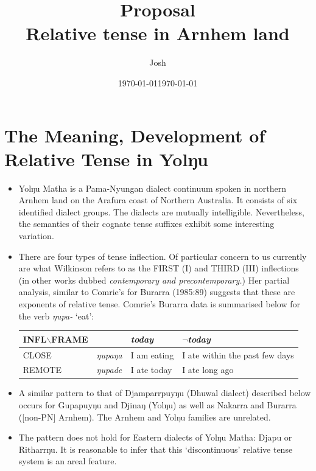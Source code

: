 \documentclass[11pt]{article}
\title{\large Proposal\\\Large \textbf{Relative tense in Arnhem land}}
\date{\today}
\author{Josh}
\date{\today}
\begin{document}
\thispagestyle{empty}
\part*{The Meaning, Development of Relative Tense in Yolŋu}
\begin{itemize}
\item 

Yolŋu Matha is a Pama-Nyungan dialect continuum spoken in northern Arnhem land on the Arafura coast of Northern Australia. It consists of six identified dialect groups. The dialects are mutually intelligible. Nevertheless, the semantics of their cognate tense suffixes exhibit some interesting variation.

\item There are four types of tense inflection. Of particular concern to us currently are what Wilkinson refers to as the FIRST (I) and THIRD (III) inflections (in other works dubbed \textit{contemporary and precontemporary.}) Her partial analysis, similar to Comrie's for Burarra (1985:89) suggests that these are exponents of relative tense. Comrie's Burarra data is summarised below for the verb \textit{ŋupa-} `eat':


\begin{tabular}{llll}
INFL$\backslash$FRAME && \textit{today} & $\neg$\textit{today}\\\midrule
CLOSE&\textit{ŋupaŋa}& I am eating & I ate within the past few days\\
REMOTE&\textit{ŋupade} & I ate today & I ate long ago
\end{tabular}


\item A similar pattern to that of Djamparrpuyŋu (Dhuwal dialect) described below occurs for Gupapuyŋu and Djinaŋ (Yolŋu) as well as Nakarra and Burarra ([non-PN] Arnhem). The Arnhem and Yolŋu families are unrelated.

\item The pattern does not hold for Eastern dialects of Yolŋu Matha: Djapu or Ritharrŋu. It is reasonable to infer that this `discontinuous' relative tense system is an areal feature.
\end{itemize}
\end{document}
